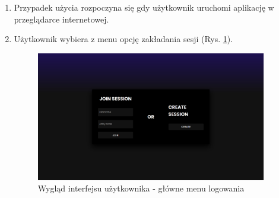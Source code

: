 \begin{enumerate}
\item Przypadek użycia rozpoczyna się gdy użytkownik uruchomi aplikację w przeglądarce internetowej.
\item Użytkownik wybiera z menu opcję zakładania sesji (Rys. \ref{fig:auth-menu}).
\begin{figure}[h]
\centering
\includegraphics[width=0.95\textwidth]{./graf/auth_menu.png}
\caption{Wygląd interfejsu użytkownika - główne menu logowania}
\label{fig:auth-menu}
\end{figure}


\end{enumerate}
